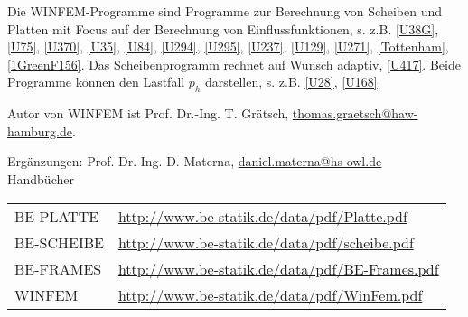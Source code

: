Die WINFEM-Programme sind Programme zur Berechnung von Scheiben und Platten mit Focus auf der Berechnung von Einflussfunktionen, s. z.B. \ref{U38G}, \ref{U75}, \ref{U370}, \ref{U35}, \ref{U84}, \ref{U294}, \ref{U295}, \ref{U237}, \ref{U129}, \ref{U271}, \ref{Tottenham}, \ref{1GreenF156}. Das Scheibenprogramm rechnet auf Wunsch adaptiv, \ref{U417}. Beide Programme k\"{o}nnen den Lastfall $p_h$ darstellen, s. z.B. \ref{U28}, \ref{U168}.

Autor von WINFEM ist Prof. Dr.-Ing. T. Gr\"{a}tsch, \href{mailto:thomas.graetsch@haw-hamburg.de}{thomas.graetsch@haw-hamburg.de}.

Erg\"{a}nzungen: Prof. Dr.-Ing. D. Materna, \href{mailto:daniel.materna@hs-owl.de}{daniel.materna@hs-owl.de} \\

Handb\"{u}cher

\begin{tabular}{l l}
  BE-PLATTE & \hspace*{1.2cm}\href{http://www.be-statik.de/data/pdf/Platte.pdf}{http://www.be-statik.de/data/pdf/Platte.pdf} \\
  BE-SCHEIBE & \hspace*{1.2cm}\href{http://www.be-statik.de/data/pdf/scheibe.pdf}{http://www.be-statik.de/data/pdf/scheibe.pdf}\\
  BE-FRAMES & \hspace*{1.2cm}\href{http://www.be-statik.de/data/pdf/BE-Frames.pdf}{http://www.be-statik.de/data/pdf/BE-Frames.pdf}\\
  WINFEM &
  \hspace*{1.2cm}\href{http://www.be-statik.de/data/pdf/WinFem.pdf}{http://www.be-statik.de/data/pdf/WinFem.pdf}
 \end{tabular}

